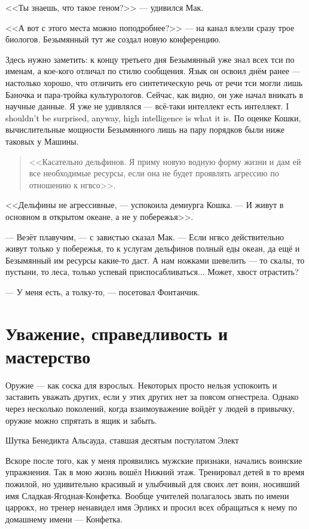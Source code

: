 <<Ты знаешь, что такое геном?>> --- удивился Мак.

<<А вот с этого места можно поподробнее?>> --- на канал влезли сразу трое биологов.
Безымянный тут же создал новую конференцию.

Здесь нужно заметить: к концу третьего дня Безымянный уже знал всех тси по именам, а кое-кого отличал по стилю сообщения.
Язык он освоил днём ранее --- настолько хорошо, что отличить его синтетическую речь от речи тси могли лишь Баночка и пара-тройка культурологов.
Сейчас, как видно, он уже начал вникать в научные данные.
{Я уже не удивлялся --- всё-таки интеллект есть интеллект.}
{I shouldn't be surprised, anyway, high intelligence is what it is.}
По оценке Кошки, вычислительные мощности Безымянного лишь на пару порядков были ниже таковых у Машины.

\begin{quote}
<<Касательно дельфинов.
Я приму новую водную форму жизни и дам ей все необходимые ресурсы, если она не будет проявлять агрессию по отношению к нгвсо>>.
\end{quote}

<<Дельфины не агрессивные, --- успокоила демиурга Кошка.
--- И живут в основном в открытом океане, а не у побережья>>.

--- Везёт плавучим, --- с завистью сказал Мак.
--- Если нгвсо действительно живут только у побережья, то к услугам дельфинов полный еды океан, да ещё и Безымянный им ресурсы какие-то даст.
А нам ножками шевелить --- то скалы, то пустыни, то леса, только успевай приспосабливаться...
Может, хвост отрастить?

--- У меня есть, а толку-то, --- посетовал Фонтанчик.

\section{Уважение, справедливость и мастерство}

\epigraph
{Оружие --- как соска для взрослых.
Некоторых просто нельзя успокоить и заставить уважать других, если у этих других нет за поясом огнестрела.
Однако через несколько поколений, когда взаимоуважение войдёт у людей в привычку, оружие можно спрятать в ящик и забыть.}
{Шутка Бенедикта Альсауда, ставшая десятым постулатом Элект}

Вскоре после того, как у меня проявились мужские признаки, начались воинские упражнения.
Так в мою жизнь вошёл Нижний этаж.
Тренировал детей в то время пожилой, но удивительно красивый и улыбчивый для своих лет воин, носивший имя Сладкая-Ягодная-Конфетка.
Вообще учителей полагалось звать по имени царрокх, но тренер ненавидел имя Эрликх и просил всех обращаться к нему по домашнему имени --- Конфетка.

